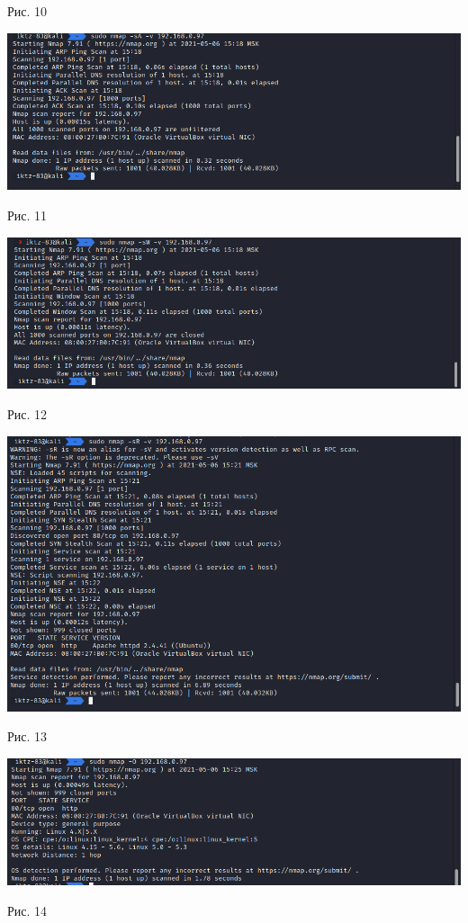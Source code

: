 \documentclass[a4paper,14pt]{extarticle}
\begin{document}
\begin{center}
        Рис. 10

        \includegraphics[scale=0.5]{pics/10.png}

        Рис. 11

        \includegraphics[scale=0.5]{pics/11.png}

        Рис. 12

        \includegraphics[scale=0.5]{pics/12.png}

        Рис. 13

        \includegraphics[scale=0.5]{pics/13.png}
        
        Рис. 14
    \end{center}
\end{document}
